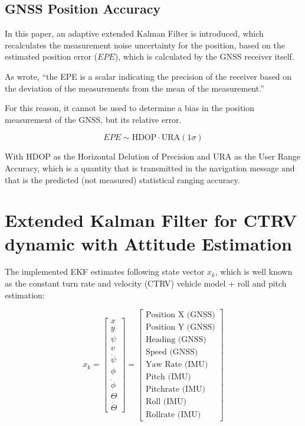 \documentclass[conference]{IEEEtran}
\begin{document}
\subsection{GNSS Position Accuracy}

In this paper, an adaptive extended Kalman Filter is introduced, which recalculates the measurement noise uncertainty for the position, based on the estimated position error ($EPE$), which is calculated by the GNSS receiver itself.

As \cite{Sharif} wrote, ``the EPE is a scalar indicating the precision of the receiver based on the deviation of the measurements from the mean of the measurement.''

For this reason, it cannot be used to determine a bias in the position measurement of the GNSS, but its relative error.

\begin{equation}EPE \sim \mathrm{HDOP} \cdot \mathrm{URA}(1 \sigma)\end{equation}

With $\text{HDOP}$ as the Horizontal Delution of Precision and $\text{URA}$ as the User Range Accuracy, which is a quantity that is transmitted in the navigation message and that is the predicted (not measured) statistical ranging accuracy.


\section{Extended Kalman Filter for CTRV dynamic with Attitude Estimation}

The implemented EKF estimates following state vector $x_k$, which is well known as the constant turn rate and velocity (CTRV) vehicle model + roll and pitch estimation:

\begin{equation}x_k= \left[ \begin{matrix}x \\ y \\ \psi \\ v \\ \dot \psi \\ \phi \\ \dot \phi \\ \Theta \\ \dot \Theta \end{matrix} \right] = \left[ \begin{matrix} \text{Position X (GNSS)} \\ \text{Position Y (GNSS)} \\ \text{Heading (GNSS)} \\ \text{Speed (GNSS)} \\ \text{Yaw Rate (IMU)} \\ \text{Pitch (IMU)} \\ \text{Pitchrate (IMU)} \\ \text{Roll (IMU)} \\ \text{Rollrate (IMU)} \end{matrix} \right]\end{equation}
\end{document}
